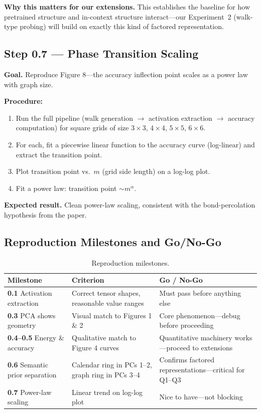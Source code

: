 \documentclass[11pt]{article}
\begin{document}
\textbf{Why this matters for our extensions.} This establishes the baseline for how pretrained structure and in-context structure interact---our Experiment~2 (walk-type probing) will build on exactly this kind of factored representation.

\subsection{Step 0.7 --- Phase Transition Scaling}

\textbf{Goal.} Reproduce Figure 8---the accuracy inflection point scales as a power law with graph size.

\textbf{Procedure:}
\begin{enumerate}
    \item Run the full pipeline (walk generation $\to$ activation extraction $\to$ accuracy computation) for square grids of size $3\times3$, $4\times4$, $5\times5$, $6\times6$.
    \item For each, fit a piecewise linear function to the accuracy curve (log-linear) and extract the transition point.
    \item Plot transition point vs.\ $m$ (grid side length) on a log-log plot.
    \item Fit a power law: transition point $\sim m^\alpha$.
\end{enumerate}

\textbf{Expected result.} Clean power-law scaling, consistent with the bond-percolation hypothesis from the paper.

\subsection{Reproduction Milestones and Go/No-Go}

\begin{table}[h]
\centering
\renewcommand{\arraystretch}{1.3}
\begin{tabular}{@{}p{3.5cm}p{7cm}p{4cm}@{}}
\toprule
\textbf{Milestone} & \textbf{Criterion} & \textbf{Go / No-Go} \\
\midrule
\textbf{0.1} Activation extraction & Correct tensor shapes, reasonable value ranges & Must pass before anything else \\
\textbf{0.3} PCA shows geometry & Visual match to Figures 1 \& 2 & Core phenomenon---debug before proceeding \\
\textbf{0.4--0.5} Energy \& accuracy & Qualitative match to Figure 4 curves & Quantitative machinery works---proceed to extensions \\
\textbf{0.6} Semantic prior separation & Calendar ring in PCs 1--2, graph ring in PCs 3--4 & Confirms factored representations---critical for Q1--Q3 \\
\textbf{0.7} Power-law scaling & Linear trend on log-log plot & Nice to have---not blocking \\
\bottomrule
\end{tabular}
\caption{Reproduction milestones.}
\end{table}
\end{document}

